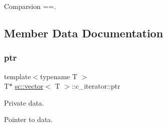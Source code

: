 Comparsion ==. 



\subsection{Member Data Documentation}
\mbox{\label{classsc_1_1vector_1_1c__iterator_a3bd93bfa6be8fbe010131942c660fe86}} 
\subsubsection{\texorpdfstring{ptr}{ptr}}
{\footnotesize\ttfamily template$<$typename T $>$ \\
T$\ast$ \hyperlink{classsc_1_1vector}{sc\+::vector}$<$ T $>$\+::c\+\_\+iterator\+::ptr\hspace{0.3cm}{\ttfamily [private]}}



Private data. 

Pointer to data. 